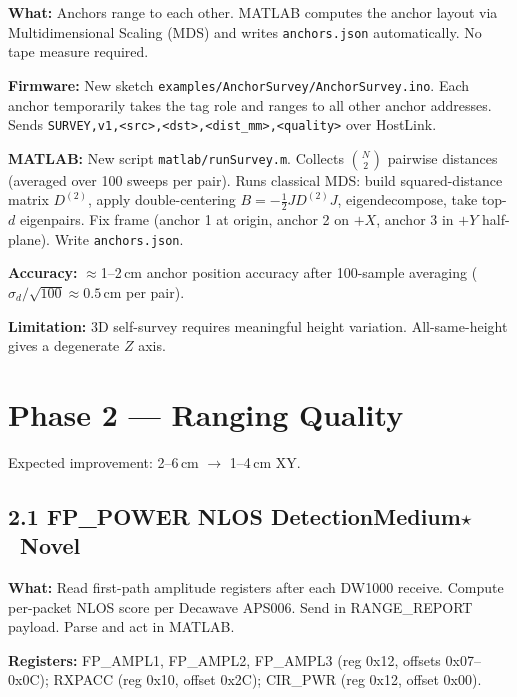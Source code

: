 \documentclass[11pt,a4paper]{article}
\newcommand{\dif}[1]{\texorpdfstring{\hfill#1}{}}
\newcommand{\novel}{\texorpdfstring{\quad\textcolor{dkred}{$\star$~\textbf{Novel}}}{[Novel]}}
\newcommand{\medium}{\textcolor{dkorange}{\textbf{Medium}}}
\begin{document}
\textbf{What:} Anchors range to each other. MATLAB computes the anchor layout via Multidimensional Scaling (MDS) and writes \texttt{anchors.json} automatically. No tape measure required.

\textbf{Firmware:} New sketch \texttt{examples/AnchorSurvey/AnchorSurvey.ino}. Each anchor temporarily takes the tag role and ranges to all other anchor addresses. Sends \texttt{SURVEY,v1,<src>,<dst>,<dist\_mm>,<quality>} over HostLink.

\textbf{MATLAB:} New script \texttt{matlab/runSurvey.m}. Collects $\binom{N}{2}$ pairwise distances (averaged over 100 sweeps per pair). Runs classical MDS: build squared-distance matrix $D^{(2)}$, apply double-centering $B = -\tfrac{1}{2}JD^{(2)}J$, eigendecompose, take top-$d$ eigenpairs. Fix frame (anchor 1 at origin, anchor 2 on $+X$, anchor 3 in $+Y$ half-plane). Write \texttt{anchors.json}.

\textbf{Accuracy:} $\approx$1--2\,cm anchor position accuracy after 100-sample averaging ($\sigma_d/\sqrt{100} \approx 0.5$\,cm per pair).

\textbf{Limitation:} 3D self-survey requires meaningful height variation. All-same-height gives a degenerate $Z$ axis.

\section{Phase 2 --- Ranging Quality}

\begin{phasebox}
Expected improvement: 2--6\,cm $\to$ 1--4\,cm XY.
\end{phasebox}

\subsection{2.1 FP\_POWER NLOS Detection\dif{\medium}\novel}

\textbf{What:} Read first-path amplitude registers after each DW1000 receive. Compute per-packet NLOS score per Decawave APS006. Send in RANGE\_REPORT payload. Parse and act in MATLAB.

\textbf{Registers:} FP\_AMPL1, FP\_AMPL2, FP\_AMPL3 (reg 0x12, offsets 0x07--0x0C); RXPACC (reg 0x10, offset 0x2C); CIR\_PWR (reg 0x12, offset 0x00).
\end{document}

